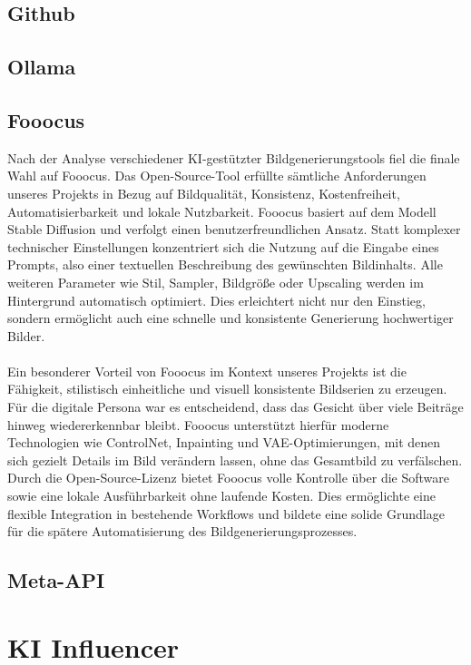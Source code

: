 \documentclass[a4paper,12pt]{article}
\begin{document}
\subsection{Github}
\subsection{Ollama}
\subsection{Fooocus}

Nach der Analyse verschiedener KI-gestützter Bildgenerierungstools fiel die finale Wahl auf Fooocus. Das Open-Source-Tool erfüllte sämtliche Anforderungen unseres Projekts in Bezug auf Bildqualität, Konsistenz, Kostenfreiheit, Automatisierbarkeit und lokale Nutzbarkeit.
Fooocus basiert auf dem Modell Stable Diffusion und verfolgt einen benutzerfreundlichen Ansatz. Statt komplexer technischer Einstellungen konzentriert sich die Nutzung auf die Eingabe eines Prompts, also einer textuellen Beschreibung des gewünschten Bildinhalts. Alle weiteren Parameter wie Stil, Sampler, Bildgröße oder Upscaling werden im Hintergrund automatisch optimiert. Dies erleichtert nicht nur den Einstieg, sondern ermöglicht auch eine schnelle und konsistente Generierung hochwertiger Bilder. \\\\
Ein besonderer Vorteil von Fooocus im Kontext unseres Projekts ist die Fähigkeit, stilistisch einheitliche und visuell konsistente Bildserien zu erzeugen. Für die digitale Persona war es entscheidend, dass das Gesicht über viele Beiträge hinweg wiedererkennbar bleibt. Fooocus unterstützt hierfür moderne Technologien wie ControlNet, Inpainting und VAE-Optimierungen, mit denen sich gezielt Details im Bild verändern lassen, ohne das Gesamtbild zu verfälschen.
Durch die Open-Source-Lizenz bietet Fooocus volle Kontrolle über die Software sowie eine lokale Ausführbarkeit ohne laufende Kosten. Dies ermöglichte eine flexible Integration in bestehende Workflows und bildete eine solide Grundlage für die spätere Automatisierung des Bildgenerierungsprozesses.

\subsection{Meta-API}


\section{KI Influencer}
\end{document}
